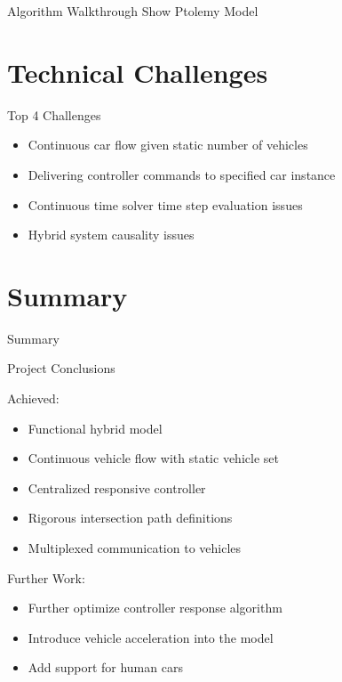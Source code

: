 \documentclass{beamer}
\begin{document}
\begin{frame}{Algorithm Walkthrough}
Show Ptolemy Model
\end{frame}

\section{Technical Challenges}

\begin{frame}
\begin{block}{Top 4 Challenges}
\begin{itemize}
\item Continuous car flow given static number of vehicles
\item Delivering controller commands to specified car instance
\item Continuous time solver time step evaluation issues
\item Hybrid system causality issues
\end{itemize}
\end{block}
\end{frame}


\section{Summary}

\begin{frame}{Summary}

\begin{block}{Project Conclusions}
\begin{minipage}{0.45\linewidth}
Achieved:
\begin{itemize}
\item Functional hybrid model 
\item Continuous vehicle flow with static vehicle set
\item Centralized responsive controller
\item Rigorous intersection path definitions
\item Multiplexed communication to vehicles
\end{itemize}
\end{minipage}
\hfill
\begin{minipage}{0.45\linewidth}
Further Work:
\begin{itemize}
\item Further optimize controller response algorithm
\item Introduce vehicle acceleration into the model
\item Add support for human cars
\end{itemize}
\end{minipage}
\end{block}
\end{frame}
\end{document}
